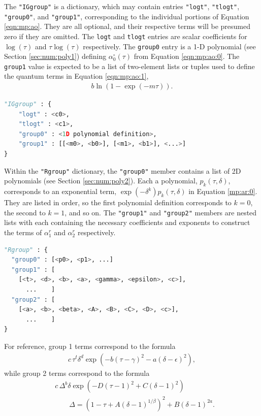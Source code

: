 The \texttt{"IGgroup"} is a dictionary, which may contain entries \texttt{"logt"}, \texttt{"tlogt"}, \texttt{"group0"}, and \texttt{"group1"}, corresponding to the individual portions of Equation \ref{eqn:mp:ao}.  They are all optional, and their respective terms will be presumed zero if they are omitted.  The \texttt{logt} and \texttt{tlogt} entries are scalar coefficients for $\log(\tau)$ and $\tau \log(\tau)$ respectively.  The \texttt{group0} entry is a 1-D polynomial (see Section \ref{sec:num:poly1}) defining $\alpha^\circ_0(\tau)$ from Equation \ref{eqn:mp:ao:0}.  The \texttt{group1} value is expected to be a list of two-element lists or tuples used to define the quantum terms in Equation \ref{eqn:mp:ao:1},
\begin{align*}
b \ln\left(1 - \exp( -m \tau )\right).
\end{align*}

\begin{lstlisting}[language=Python]
"IGgroup" : {
    "logt" : <c0>,
    "tlogt" : <c1>,
    "group0" : <1D polynomial definition>,
    "group1" : [[<m0>, <b0>], [<m1>, <b1>], <...>]
}
\end{lstlisting}

Within the \texttt{"Rgroup"} dictionary, the \texttt{"group0"} member contains a list of 2D polynomials (see Section \ref{sec:num:poly2}).  Each a polynomial, $p_k(\tau,\delta)$, corresponds to an exponential term, $\exp(-\delta^k) p_k(\tau, \delta)$ in Equation \ref{mp:ar:0}.  They are listed in order, so the first polynomial definition corresponds to $k=0$, the second to $k=1$, and so on.  The \texttt{"group1"} and \texttt{"group2"} members are nested lists with each containing the necessary coefficients and exponents to construct the terms of $\alpha^r_1$ and $\alpha^r_2$ respectively.  
\begin{lstlisting}[language=Python]
"Rgroup" : {
  "group0" : [<p0>, <p1>, ...]
  "group1" : [
    [<t>, <d>, <b>, <a>, <gamma>, <epsilon>, <c>],
      ...    ]
  "group2" : [
    [<a>, <b>, <beta>, <A>, <B>, <C>, <D>, <c>], 
      ...    ]
}
\end{lstlisting}

For reference, group 1 terms correspond to the formula
\begin{align*}
c\, \tau^t \delta^d \exp\left(-b(\tau-\gamma)^2 - a(\delta-\epsilon)^2 \right),
\end{align*}
while group 2 terms correspond to the formula
\begin{align*}
&c\, \Delta^b \delta \exp\left(-D(\tau-1)^2 + C(\delta-1)^2 \right)\\
& \hspace{2em} \Delta = \left(1 -\tau + A(\delta-1)^{1/\beta}\right)^2 + B(\delta-1)^{2a}.
\end{align*}

